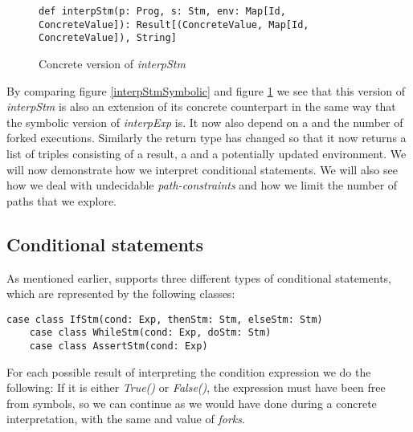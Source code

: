 \begin{figure}[!h]
	\begin{lstlisting}[style=simple]
		def interpStm(p: Prog, s: Stm, env: Map[Id, ConcreteValue]): Result[(ConcreteValue, Map[Id, ConcreteValue]), String]
	\end{lstlisting}
	\caption{Concrete version of \textsl{interpStm}}
	\label{interpStmConcrete}
\end{figure}
By comparing figure \ref{interpStmSymbolic} and figure \ref{interpStmConcrete} we see that this version of \textsl{interpStm} is also an extension of its concrete counterpart in the same way that the symbolic version of \textsl{interpExp} is. It now also depend on a \pc and the number of forked executions. Similarly the return type has changed so that it now returns a list of triples consisting of a result, a \pc and a potentially updated environment. We will now demonstrate how we interpret conditional statements. We will also see how we deal with undecidable \emph{path-constraints} and how we limit the number of paths that we explore.


\iffalse

\subsection{Assignment statements}
Given an \textsl{Assignment}-statement \textsl{AssignStm(v: Var, e: Exp)}, we interpret the expression $e$, and get a list of results for each possible execution path. For each of these results, we return the value of the expression and an updated environment. If the expression resulted in an error, or a unit 
value, we instead return error and the original environment. 

\fi

\subsection{Conditional statements}

As mentioned earlier, \explanguage supports three different types of conditional statements, which are represented by the following classes:

\begin{lstlisting}[style=simple]
	case class IfStm(cond: Exp, thenStm: Stm, elseStm: Stm)
	case class WhileStm(cond: Exp, doStm: Stm)
	case class AssertStm(cond: Exp)
\end{lstlisting}
For each possible result of interpreting the condition expression we do the following: If it is either \textsl{True()} or \textsl{False()}, the expression must have been free from symbols, so we can continue as we would have done during a concrete interpretation, with the same \pc and value of \textsl{forks}.

